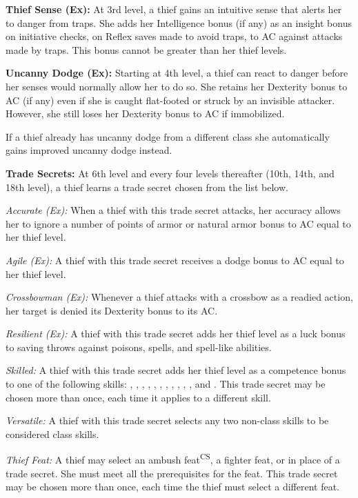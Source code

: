 \textbf{Thief Sense (Ex):} At 3rd level, a thief gains an intuitive sense that alerts her to danger from traps. She adds her Intelligence bonus (if any) as an insight bonus on initiative checks, on Reflex saves made to avoid traps, to AC against attacks made by traps. This bonus cannot be greater than \onehalf her thief levels.

\textbf{Uncanny Dodge (Ex):} Starting at 4th level, a thief can react to danger before her senses would normally allow her to do so. She retains her Dexterity bonus to AC (if any) even if she is caught flat-footed or struck by an invisible attacker. However, she still loses her Dexterity bonus to AC if immobilized.

If a thief already has uncanny dodge from a different class she automatically gains improved uncanny dodge instead.

\textbf{Trade Secrets:} At 6th level and every four levels thereafter (10th, 14th, and 18th level), a thief learns a trade secret chosen from the list below.

\textit{Accurate (Ex):} When a thief with this trade secret attacks, her accuracy allows her to ignore a number of points of armor or natural armor bonus to AC equal to \onequarter her thief level.

\textit{Agile (Ex):} A thief with this trade secret receives a dodge bonus to AC equal to \onequarter her thief level.

\textit{Crossbowman (Ex):} Whenever a thief attacks with a crossbow as a readied action, her target is denied its Dexterity bonus to its AC.

\textit{Resilient (Ex):} A thief with this trade secret adds \onehalf her thief level as a luck bonus to saving throws against poisons, spells, and spell-like abilities.

\textit{Skilled:} A thief with this trade secret adds \onequarter her thief level as a competence bonus to one of the following skills: , , , , , , , , , , , and . This trade secret may be chosen more than once, each time it applies to a different skill.

\textit{Versatile:} A thief with this trade secret selects any two non-class skills to be considered class skills.

\textit{Thief Feat:} A thief may select an ambush feat\textsuperscript{CS}, a fighter feat, or  in place of a trade secret. She must meet all the prerequisites for the feat. This trade secret may be chosen more than once, each time the thief must select a different feat.

